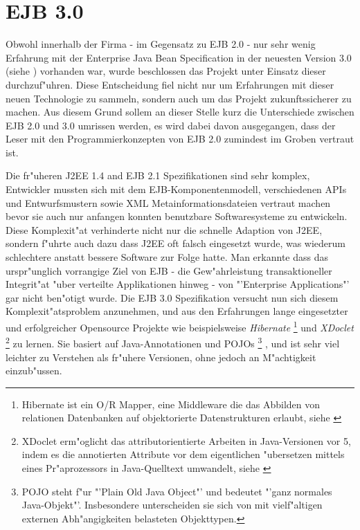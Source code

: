 \section{EJB 3.0}
\label{sec:chap2:ejb3}

Obwohl innerhalb der Firma - im Gegensatz zu EJB 2.0 - nur sehr wenig Erfahrung mit der Enterprise Java Bean Specification in der
neuesten Version 3.0 (siehe \cite{EJBHP}) vorhanden war, wurde beschlossen das Projekt unter Einsatz dieser durchzuf"uhren. 
Diese Entscheidung fiel nicht nur um Erfahrungen mit dieser neuen Technologie zu sammeln, sondern auch um das Projekt zukunftssicherer 
zu machen.
Aus diesem Grund sollem an dieser Stelle kurz die Unterschiede zwischen EJB 2.0 und 3.0 umrissen werden, es wird dabei
davon ausgegangen, dass der Leser mit den Programmierkonzepten von EJB 2.0 zumindest im Groben vertraut ist.

Die fr"uheren J2EE 1.4 and EJB 2.1 Spezifikationen sind sehr komplex, Entwickler mussten sich mit dem EJB-Komponentenmodell,
verschiedenen APIs und Entwurfsmustern sowie XML Metainformationsdateien vertraut machen bevor sie auch nur anfangen konnten
benutzbare Softwaresysteme zu entwickeln. Diese Komplexit"at verhinderte nicht nur die schnelle Adaption von J2EE,
sondern f"uhrte auch dazu dass J2EE oft falsch eingesetzt wurde, was wiederum schlechtere anstatt bessere Software zur Folge hatte.
Man erkannte dass das urspr"unglich vorrangige Ziel von EJB - die Gew"ahrleistung transaktioneller Integrit"at "uber verteilte 
Applikationen hinweg - von "'Enterprise Applications"' gar nicht ben"otigt wurde.
Die EJB 3.0 Spezifikation versucht nun sich diesem Komplexit"atsproblem anzunehmen, und aus den Erfahrungen lange eingesetzter
und erfolgreicher Opensource Projekte wie beispielsweise \emph{Hibernate}
\footnote{Hibernate ist ein O/R Mapper, eine Middleware die das Abbilden von relationen Datenbanken auf objektorierte
Datenstrukturen erlaubt, siehe \cite{HIBERNATEHP}}
und \emph{XDoclet}
\footnote{XDoclet erm"oglicht das attributorientierte Arbeiten in Java-Versionen vor 5, indem es die annotierten Attribute
vor dem eigentlichen "ubersetzen mittels eines Pr"aprozessors in Java-Quelltext umwandelt, siehe \cite{XDOCLETHP}}
zu lernen. Sie basiert auf Java-Annotationen und POJOs
\footnote{POJO steht f"ur "'Plain Old Java Object"' und bedeutet "'ganz normales Java-Objekt"'. Insbesondere unterscheiden sie sich
von mit vielf"altigen externen Abh"angigkeiten belasteten Objekttypen.}
, und ist sehr viel leichter zu Verstehen als fr"uhere Versionen, ohne jedoch an M"achtigkeit einzub"ussen.

